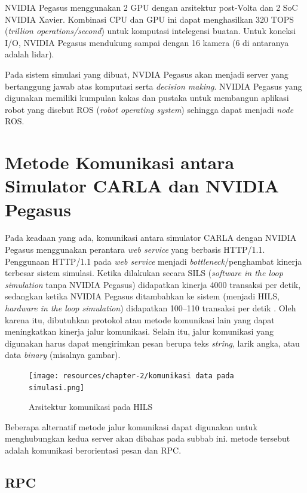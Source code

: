 NVIDIA Pegasus menggunakan 2 GPU dengan arsitektur post-Volta dan 2 SoC NVIDIA
Xavier. Kombinasi CPU dan GPU ini dapat menghasilkan 320 TOPS (\textit{trillion
    operations/second}) untuk komputasi intelegensi buatan. Untuk koneksi I/O,
NVIDIA Pegasus mendukung sampai dengan 16 kamera (6 di antaranya adalah lidar).

Pada sistem simulasi yang dibuat, NVDIA Pegasus akan menjadi server yang
ber\-tang\-gung jawab atas komputasi serta \textit{decision making}. NVIDIA
Pegasus yang digunakan memiliki kumpulan kakas dan pustaka untuk membangun
aplikasi robot yang disebut ROS (\textit{robot operating system}) sehingga dapat
menjadi \textit{node} ROS.

\section{Metode Komunikasi antara Simulator CARLA dan NVI\-DI\-A Pegasus}

Pada keadaan yang ada, komunikasi antara simulator CARLA dengan NVIDIA Pegasus
menggunakan perantara \textit{web service} yang berbasis HTTP/1.1. Penggunaan
HTTP/1.1 pada \textit{web service} menjadi \textit{bottleneck}/penghambat
kinerja terbesar sistem simulasi. Ketika dilakukan secara SILS (\textit{software
    in the loop simulation} tanpa NVIDIA Pegasus) didapatkan kinerja 4000 transaksi
per detik, sedangkan ketika NVIDIA Pegasus ditambahkan ke sistem (menjadi HILS,
\textit{hardware in the loop simulation}) didapatkan 100--110 transaksi per
detik \parencite{trilaksono_laporanRispro}. Oleh karena itu, dibutuhkan protokol
atau metode komunikasi lain yang dapat meningkatkan kinerja jalur komunikasi.
Selain itu, jalur komunikasi yang digunakan harus dapat mengirimkan pesan berupa
teks \textit{string}, larik angka, atau data \textit{binary} (misalnya gambar).

\begin{figure}
    \centering
    \texttt{[image: resources/chapter-2/komunikasi
        data pada simulasi.png]}
    \caption{Arsitektur komunikasi pada HILS
        \parencite{trilaksono_laporanRispro}}
\end{figure}

Beberapa alternatif metode jalur komunikasi dapat digunakan untuk
meng\-hu\-bung\-kan kedua server akan dibahas pada subbab ini. metode tersebut
adalah komunikasi berorientasi pesan dan RPC.

\subsection{RPC}

